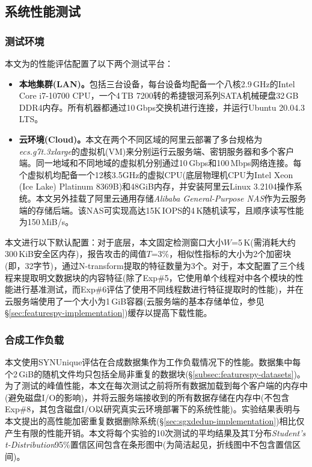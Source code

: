 \subsection{系统性能测试}
\label{subsec:featurespy-evaluation-performance}

\subsubsection{测试环境}
\label{subsubsec:featurespy-platform}

本文为\prototype 的性能评估配置了以下两个测试平台：

\begin{itemize}[leftmargin=0em]
    \item {\bf 本地集群(LAN)。}包括三台设备，每台设备均配备一个八核2.9\,GHz的Intel Core i7-10700 CPU，一个4\,TB 7200转的希捷银河系列SATA机械硬盘32\,GB DDR4内存。所有机器都通过10\,Gbps交换机进行连接，并运行Ubuntu 20.04.3 LTS。
    \item {\bf 云环境(Cloud)。}本文在两个不同区域的阿里云部署了多台规格为\textit{ecs.g7t.3xlarge}的虚拟机(VM)来分别运行云服务端、密钥服务器和多个客户端。同一地域和不同地域的虚拟机分别通过10\,Gbps和100\,Mbps网络连接。每个虚拟机均配备一个12核3.5GHz的虚拟CPU(底层物理机CPU为Intel Xeon (Ice Lake) Platinum 8369B)和48GiB内存，并安装阿里云Linux 3.2104操作系统。本文另外挂载了阿里云通用存储\textit{Alibaba General-Purpose NAS}作为云服务端的存储后端。该NAS可实现高达15K\,IOPS的4\,K随机读写，且顺序读写性能为150\,MiB/s。
\end{itemize}

本文进行以下默认配置：对于底层\sysnameF，本文固定检测窗口大小$W$=5\,K(需消耗大约300\,KiB安全区内存)，报告攻击的阈值$T$=3\%，相似性指标的大小为2个加密块(即，32字节)，通过N-transform提取的特征数量为3个。对于\prototype，本文配置了三个线程来提取明文数据块的内容特征(除了Exp\#5，它使用单个线程对\prototype 中各个模块的性能进行基准测试，而Exp\#6评估了\prototype 使用不同线程数进行特征提取时的性能)，并在云服务端使用了一个大小为1\,GiB容器(云服务端的基本存储单位，参见\S\ref{sec:featurespy-implementation})缓存以提高下载性能。

\subsubsection{合成工作负载}
\label{subsubsec:featurespy-syn}
本文使用SYNUnique评估\prototype 在合成数据集作为工作负载情况下的性能。数据集中每个2\,GiB的随机文件均只包括全局非重复的数据块(\S\ref{subsec:featurespy-datasets})。为了测试\prototype 的峰值性能，本文在每次测试之前将所有数据加载到每个客户端的内存中(避免磁盘I/O的影响)，并将云服务端接收到的所有数据存储在内存中(不包含Exp\#8，其包含磁盘I/O以研究真实云环境部署下的系统性能)。实验结果表明\prototype 与本文提出的高性能加密重复数据删除系统\sysnameS (\S\ref{sec:sgxdedup-implementation})相比仅产生有限的性能开销。本文将每个实验的10次测试的平均结果及其T分布\textit{Student's t-Distribution}95\%置信区间包含在条形图中(为简洁起见，折线图中不包含置信区间)。

